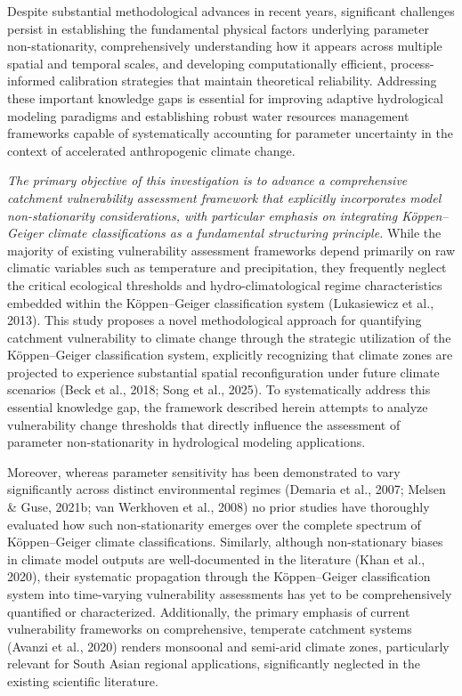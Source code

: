 \documentclass[
]{article}
\begin{document}
Despite substantial methodological advances in recent years, significant
challenges persist in establishing the fundamental physical factors
underlying parameter non-stationarity, comprehensively understanding how
it appears across multiple spatial and temporal scales, and developing
computationally efficient, process-informed calibration strategies that
maintain theoretical reliability. Addressing these important knowledge
gaps is essential for improving adaptive hydrological modeling paradigms
and establishing robust water resources management frameworks capable of
systematically accounting for parameter uncertainty in the context of
accelerated anthropogenic climate change.

\emph{The primary objective of this investigation is to advance a
comprehensive catchment vulnerability assessment framework that
explicitly incorporates model non-stationarity considerations, with
particular emphasis on integrating Köppen--Geiger climate
classifications as a fundamental structuring principle.} While the
majority of existing vulnerability assessment frameworks depend
primarily on raw climatic variables such as temperature and
precipitation, they frequently neglect the critical ecological
thresholds and hydro-climatological regime characteristics embedded
within the Köppen--Geiger classification system (Lukasiewicz et al.,
2013). This study proposes a novel methodological approach for
quantifying catchment vulnerability to climate change through the
strategic utilization of the Köppen--Geiger classification system,
explicitly recognizing that climate zones are projected to experience
substantial spatial reconfiguration under future climate scenarios (Beck
et al., 2018; Song et al., 2025). To systematically address this
essential knowledge gap, the framework described herein attempts to
analyze vulnerability change thresholds that directly influence the
assessment of parameter non-stationarity in hydrological modeling
applications.

Moreover, whereas parameter sensitivity has been demonstrated to vary
significantly across distinct environmental regimes (Demaria et al.,
2007; Melsen \& Guse, 2021b; van Werkhoven et al., 2008) no prior
studies have thoroughly evaluated how such non-stationarity emerges over
the complete spectrum of Köppen--Geiger climate classifications.
Similarly, although non-stationary biases in climate model outputs are
well-documented in the literature (Khan et al., 2020), their systematic
propagation through the Köppen--Geiger classification system into
time-varying vulnerability assessments has yet to be comprehensively
quantified or characterized. Additionally, the primary emphasis of
current vulnerability frameworks on comprehensive, temperate catchment
systems (Avanzi et al., 2020) renders monsoonal and semi-arid climate
zones, particularly relevant for South Asian regional applications,
significantly neglected in the existing scientific literature.
\end{document}
